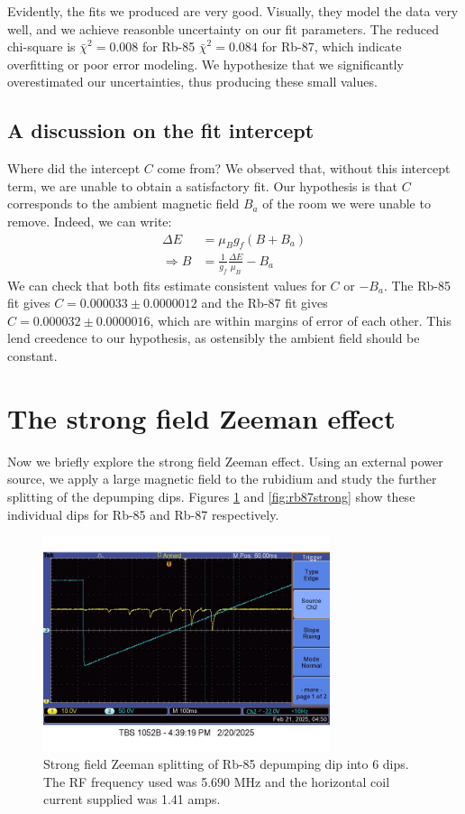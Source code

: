 \documentclass[12pt, letterpaper]{article}
\begin{document}
Evidently, the fits we produced are very good. Visually, they model the data very well, and we achieve reasonble uncertainty on our fit parameters. The reduced chi-square is $\bar{\chi}^2=0.008$ for Rb-85 $\bar{\chi}^2=0.084$ for Rb-87, which indicate overfitting or poor error modeling. We hypothesize that we significantly overestimated our uncertainties, thus producing these small values. 

\subsection{A discussion on the fit intercept}

Where did the intercept $C$ come from? We observed that, without this intercept term, we are unable to obtain a satisfactory fit. Our hypothesis is that $C$ corresponds to the ambient magnetic field $B_a$ of the room we were unable to remove. Indeed, we can write:
\begin{align*}
    \Delta E &= \mu_B g_f (B + B_{a}) \\
    \Rightarrow B &= \frac{1}{g_f} \frac{\Delta E}{\mu_B} - B_a
\end{align*}
We can check that both fits estimate consistent values for $C$ or $-B_a$. The Rb-85 fit gives $C = 0.000033 \pm 0.0000012$ and the Rb-87 fit gives $C = 0.000032 \pm 0.0000016$, which are within margins of error of each other. This lend creedence to our hypothesis, as ostensibly the ambient field should be constant. 

\section{The strong field Zeeman effect} \label{sec:strong}

Now we briefly explore the strong field Zeeman effect. Using an external power source, we apply a large magnetic field to the rubidium and study the further splitting of the depumping dips. Figures \ref{fig:rb85strong} and \ref{fig:rb87strong} show these individual dips for Rb-85 and Rb-87 respectively. 

\begin{figure}[!h]
    \centering
    \includegraphics[width=0.75\textwidth]{experiment4/figures/rb85_strong.jpg}
    \caption{Strong field Zeeman splitting of Rb-85 depumping dip into 6 dips. The RF frequency used was 5.690 MHz and the horizontal coil current supplied was 1.41 amps.}
    \label{fig:rb85strong}
\end{figure}
\end{document}

